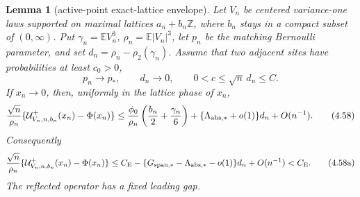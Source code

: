\documentclass[11pt,a4paper]{article}
\numberwithin{equation}{section}
\newtheorem{lemma}[theorem]{Lemma}
\theoremstyle{definition}
\theoremstyle{remark}
\newcommand{\E}{\mathbb E}
\newcommand{\CE}{C_{\mathrm E}}
\begin{document}
\begin{lemma}[active-point exact-lattice envelope]\label{orig:lem:anchored}
Let \(V_n\) be centered variance-one laws supported on maximal lattices
\(a_n+b_n\mathbb Z\), where \(b_n\) stays in a compact subset of
\((0,\infty)\).  Put
\(\gamma_n=\E V_n^3\), \(\rho_n=\E|V_n|^3\), let $p_n$ be the matching
Bernoulli parameter, and set $d_n=\rho_n-\rho_2(\gamma_n)$.  Assume that
two adjacent sites have probabilities at least \(c_0>0\),
\[
 p_n\to p_*,\qquad d_n\to0,\qquad
 0<c\le\sqrt n\,d_n\le C.
\]
If \(x_n\to0\), then, uniformly in the lattice phase of \(x_n\),
\[
 {\sqrt n\over\rho_n}
 \{\mathcal U^+_{V_n,n,b_n}(x_n)-\Phi(x_n)\}
 \le {\phi_0\over\rho_n}\left({b_n\over2}+{\gamma_n\over6}\right)
 +\{\Lambda_{\rm abs,*}+o(1)\}d_n+O(n^{-1}).          \tag{4.58}
\]
Consequently
\[
 {\sqrt n\over\rho_n}
 \{\mathcal U^+_{V_n,n,b_n}(x_n)-\Phi(x_n)\}
 \le\CE-\{G_{\rm span,*}-\Lambda_{\rm abs,*}-o(1)\}d_n
       +O(n^{-1})<\CE.                                \tag{4.58a}
\]
The reflected operator has a fixed leading gap.
\end{lemma}
\end{document}
